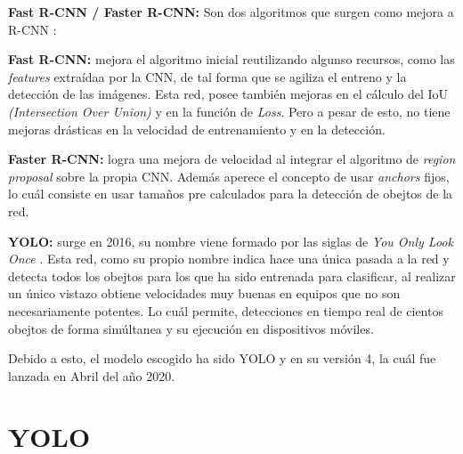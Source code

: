 \begin{list}{\textbullet}{ %
    \addtolength{\itemsep}{-2mm} %
    \setlength{\itemindent}{2mm}}

    \item \textbf{Fast R-CNN / Faster R-CNN:} Son dos algoritmos que surgen como mejora a R-CNN \cite{faster_rcnn}:
    \begin{list}{\textbullet}{ %
        \addtolength{\itemsep}{-2mm} %
        \setlength{\itemindent}{2mm}}
        \item \textbf{Fast R-CNN:} mejora el algoritmo inicial reutilizando algunso recursos, como las \textit{features} extraídaa por la CNN, de tal forma que se agiliza el entreno y la detección de las imágenes.
        Esta red, posee también mejoras en el cálculo del IoU \textit{(Intersection Over Union)} y en la función de \textit{Loss}. Pero a pesar de esto, no tiene mejoras drásticas en la velocidad de entrenamiento y en la detección.
        \clearpage
       \item \textbf{Faster R-CNN:} logra una mejora de velocidad al integrar el algoritmo de \textit{region proposal} \cite{region_proposal} sobre la propia CNN.
       Además aperece el concepto de usar \textit{anchors} fijos, lo cuál consiste en usar tamaños pre calculados para la detección de obejtos de la red.
    \end{list}

    \item \textbf{YOLO:} surge en 2016, su nombre viene formado por las siglas de \textit{You Only Look Once} \cite{yolov4}.
    Esta red, como su propio nombre indica hace una única pasada a la red y detecta todos los obejtos para los que ha sido entrenada para clasificar, al realizar un único vistazo obtiene velocidades muy buenas en equipos que no son necesariamente potentes. Lo cuál permite, detecciones en tiempo real de cientos obejtos de forma simúltanea y su ejecución en dispositivos móviles.  
\end{list}
Debido a esto, el modelo escogido ha sido YOLO y en su versión 4, la cuál fue lanzada en Abril del año 2020.


\section{YOLO}

